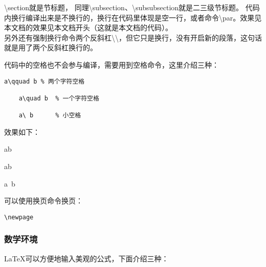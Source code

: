 \backslash section就是节标题，
同理\backslash subsection、\backslash subsubsection就是二三级节标题。
代码内换行编译出来是不换行的，换行在代码里体现是空一行，或者命令\backslash par。效果见本文档的效果见本文档开头（这就是本文档的代码）。
\\另外还有强制换行命令两个反斜杠\backslash\backslash ，但它只是换行，没有开启新的段落，这句话就是用了两个反斜杠换行的。

代码中的空格也不会参与编译，需要用到空格命令，这里介绍三种：

\begin{center}
\begin{minipage}{0.8\textwidth}
    \hspace{1em}
\begin{lstlisting}[language={[LaTeX]TeX}]
    a\qquad b % 两个字符空格

    a\quad b  % 一个字符空格 
    
    a\ b      % 小空格
\end{lstlisting}
\end{minipage}
\end{center}

效果如下：
\begin{center}
\begin{minipage}{0.8\textwidth}
a\qquad b 

a\quad b 

a\ b 
\end{minipage}
\end{center}

可以使用换页命令换页：
\begin{center}
\begin{minipage}{0.8\textwidth}
    \hspace{1em}
\begin{lstlisting}[language={[LaTeX]TeX}]
\newpage
\end{lstlisting}
\end{minipage}
\end{center}

\subsubsection{数学环境}

\LaTeX{}可以方便地输入美观的公式，下面介绍三种：

